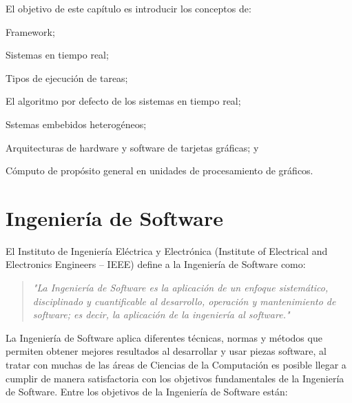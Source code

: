     El objetivo de este capítulo es introducir los conceptos de: 
    \begin{inparaenum}
    \item Framework;
    \item Sistemas en tiempo real;
    \item Tipos de ejecución de tareas; 
    \item El algoritmo por defecto de los sistemas en tiempo real; 
    \item Sstemas embebidos heterogéneos; 
    \item Arquitecturas de hardware y software de tarjetas gráficas; y 
    \item Cómputo de propósito general en unidades de procesamiento de gráficos.
    \end{inparaenum}
     \section{Ingeniería de Software}

 El Instituto de Ingeniería Eléctrica y Electrónica (Institute of Electrical and Electronics Engineers – IEEE) define a la Ingeniería de Software como:

\begin{quote}
\textit{"La Ingeniería de Software\cite{IeeeSG} es la aplicación de un enfoque sistemático, disciplinado y cuantificable al desarrollo, operación y mantenimiento de software; es decir, la aplicación de la ingeniería al software."}
\end{quote}

La Ingeniería de Software aplica diferentes técnicas, normas y métodos que permiten obtener mejores resultados al desarrollar y usar piezas software, al tratar con muchas de las áreas de Ciencias de la Computación es posible llegar a cumplir de manera satisfactoria con los objetivos fundamentales de la Ingeniería de Software. Entre los objetivos de la Ingeniería de Software están\cite{enSWE}:

